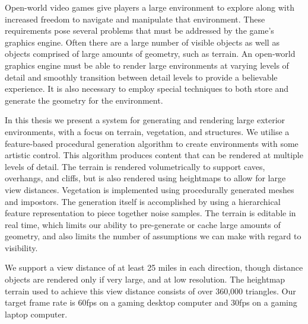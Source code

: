 Open-world video games give players a large environment to explore along with increased freedom to navigate and manipulate that environment. These requirements pose several problems that must be addressed by the game’s graphics engine. Often there are a large number of visible objects as well as objects comprised of large amounts of geometry, such as terrain. An open-world graphics engine must be able to render large environments at varying levels of detail and smoothly transition between detail levels to provide a believable experience. It is also necessary to employ special techniques to both store and generate the geometry for the environment.

In this thesis we present a system for generating and rendering large exterior environments, with a focus on terrain, vegetation, and structures. We utilise a feature-based procedural generation algorithm to create environments with some artistic control. This algorithm produces content that can be rendered at multiple levels of detail. The terrain is rendered volumetrically to support caves, overhangs, and cliffs, but is also rendered using heightmaps to allow for large view distances. Vegetation is implemented using procedurally generated meshes and impostors. The generation itself is accomplished by using a hierarchical feature representation to piece together noise samples. The terrain is editable in real time, which limits our ability to pre-generate or cache large amounts of geometry, and also limits the number of assumptions we can make with regard to visibility.

We support a view distance of at least 25 miles in each direction, though distance objects are rendered only if very large, and at low resolution. The heightmap terrain used to achieve this view distance consists of over 360,000 triangles. Our target frame rate is 60fps on a gaming desktop computer and 30fps on a gaming laptop computer.
